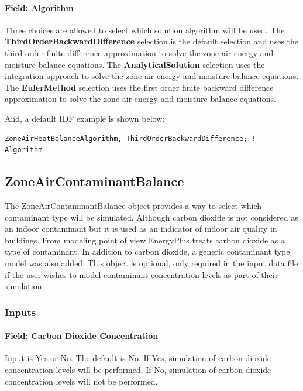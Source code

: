 \paragraph{Field: Algorithm}\label{field-algorithm-3-000}

Three choices are allowed to select which solution algorithm will be used. The \textbf{ThirdOrderBackwardDifference} selection is the default selection and uses the third order finite difference approximation to solve the zone air energy and moisture balance equations. The \textbf{AnalyticalSolution} selection uses the integration approach to solve the zone air energy and moisture balance equations. The \textbf{EulerMethod} selection uses the first order finite backward difference approximation to solve the zone air energy and moisture balance equations.

And, a default IDF example is shown below:

\begin{lstlisting}
ZoneAirHeatBalanceAlgorithm, ThirdOrderBackwardDifference; !- Algorithm
\end{lstlisting}

\subsection{ZoneAirContaminantBalance}\label{zoneaircontaminantbalance}

The ZoneAirContaminantBalance object provides a way to select which contaminant type will be simulated. Although carbon dioxide is not considered as an indoor contaminant but it is used as an indicator of indoor air quality in buildings. From modeling point of view EnergyPlus treats carbon dioxide as a type of contaminant. In addition to carbon dioxide, a generic contaminant type model was also added. This object is optional, only required in the input data file if the user wishes to model contaminant concentration levels as part of their simulation.

\subsubsection{Inputs}\label{inputs-9-021}

\paragraph{Field: Carbon Dioxide Concentration}\label{field-carbon-dioxide-concentration}

Input is Yes or No. The default is No. If Yes, simulation of carbon dioxide concentration levels will be performed. If No, simulation of carbon dioxide concentration levels will not be performed.

